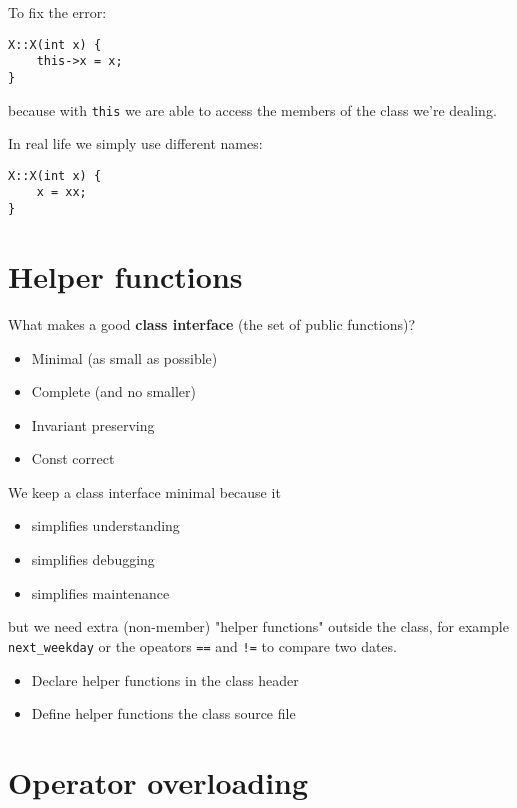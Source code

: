 To fix the error:
\begin{lstlisting}
X::X(int x) {
    this->x = x;
}
\end{lstlisting}
because with \texttt{this} we are able to access the members of the class we're dealing.

In real life we simply use different names:
\begin{lstlisting}
X::X(int x) {
    x = xx;
}   
\end{lstlisting}


\section{Helper functions} %
\label{sec:helper_functions}

What makes a good \textbf{class interface} (the set of public functions)?
\begin{itemize}
    \item Minimal (as small as possible)
    \item Complete (and no smaller)
    \item Invariant preserving
    \item Const correct
\end{itemize}

We keep a class interface minimal because it
\begin{itemize}[>]
    \item simplifies understanding
    \item simplifies debugging
    \item simplifies maintenance
\end{itemize}
but we need extra (non-member) "helper functions" outside the class, for example \lstinline|next_weekday| or the opeators \lstinline|==| and \lstinline|!=| to compare two dates. 

\begin{marker}
\begin{itemize}
        \item Declare helper functions in the class header
        \item Define helper functions the class source file
\end{itemize}    
\end{marker}  


\newpage

\section{Operator overloading} %
\label{sec:operators}

